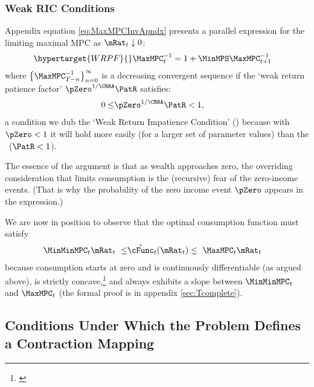 \documentclass[BufferStockTheory]{subfiles}
\begin{document}
\subsubsection{Weak RIC Conditions}{}\label{sec:WRIC}
\hypertarget{MPCnvrsUpper}{}
\hypertarget{WRIC}{}
Appendix equation \eqref{eq:MaxMPCInvApndx} presents a parallel expression for the limiting maximal MPC as $\mRat_{t} \downarrow 0$:
\begin{align}\hypertarget{WRPF}{}  
  \MaxMPC_{t}^{-1}  & = 1+\MinMPS \MaxMPC_{t+1}^{-1} \label{eq:MaxMPCInv}
\end{align}
where $\left\{\MaxMPC_{T-n}^{-1}\right\} _{n=0}^{\infty}$ is a decreasing %
convergent sequence if the `weak return patience factor' $\pZero^{1/\CRRA}\PatR$ satisfies:
\begin{align}
  0 \leq & \pZero^{1/\CRRA} \PatR < 1 \label{eq:WRIC},
\end{align}
a condition we dub the `Weak Return Impatience Condition' (\WRIC)
because with $\pZero < 1$ it will hold more easily (for a larger set of parameter
values) than the \RIC~($\PatR < 1$).

The essence of the argument is that as wealth approaches zero, the overriding
consideration that limits consumption is the (recursive) fear of the zero-income events.  (That is why the probability of the zero
income event $\pZero$ appears in the expression.)  

\hypertarget{cBounds}{}
We are now in position to observe that the optimal consumption function must satisfy
\begin{align}
  \MinMinMPC_{t} \mRat_{t} ~ \leq &   \mathring{\cFunc}_{t}(\mRat_{t})  \leq  ~ \MaxMPC_{t} \mRat_{t} \label{eq:cBounds}
\end{align}
because consumption starts at zero and is continuously differentiable (as argued above), is strictly concave,\footnote{\cite{ckConcavity}} and always exhibits a slope between $\MinMinMPC_{t}$ and $\MaxMPC_{t}$ (the formal proof is in appendix \ref{sec:Tcomplete}).


\begin{comment}
  If the \FHWC~does not hold, we make do with a less useful bound on the minimal MPC: It is
  weakly greater than zero, which follows from the logic in
  \ref{sec:cExists}; hence the `max' in \eqref{eq:MinMinMPCDef}.
\end{comment}

\hypertarget{Conditions-Under-Which-the-Problem-Defines-a-Contraction-Mapping}{}
\subsection{Conditions Under Which the Problem Defines a Contraction Mapping}
\end{document}
